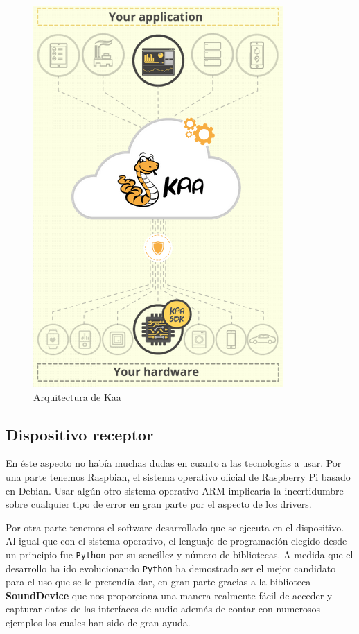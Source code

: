 \begin{figure}[ht]
  \begin{center}
    \includegraphics[scale=0.40]{../images/kaa/arqui.png}
		\caption{Arquitectura de Kaa}
    \label{fig:kaalog}
	\end{center}
\end{figure}


\newpage

\subsection{Dispositivo receptor}

En éste aspecto no había muchas dudas en cuanto a las tecnologías a usar. Por una parte tenemos Raspbian, el sistema operativo oficial de Raspberry Pi basado en Debian. Usar algún otro sistema operativo ARM implicaría la incertidumbre sobre cualquier tipo de error en gran parte por el aspecto de los drivers.

\bigskip
Por otra parte tenemos el software desarrollado que se ejecuta en el dispositivo. Al igual que con el sistema operativo, el lenguaje de programación elegido desde un principio fue {\tt Python} por su sencillez y número de bibliotecas. A medida que el desarrollo ha ido evolucionando {\tt Python} ha demostrado ser el mejor candidato para el uso que se le pretendía dar, en gran parte gracias a la biblioteca \textbf{SoundDevice} que nos proporciona una manera realmente fácil de acceder y capturar datos de las interfaces de audio además de contar con numerosos ejemplos los cuales han sido de gran ayuda.

